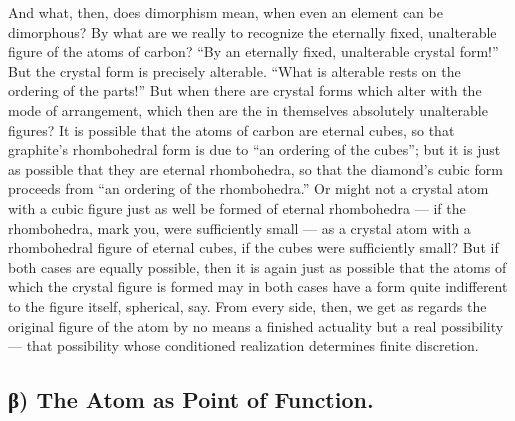 \documentclass[12pt,a4paper]{book}
\begin{document}
And what, then, does dimorphism mean, when even an element can be dimorphous?
By what are we really to recognize the eternally fixed, unalterable figure of
the atoms of carbon? ``By an eternally fixed, unalterable crystal form!''
But the crystal form is precisely alterable. ``What is alterable rests on the
ordering of the parts!'' But when there are crystal forms which alter with the
mode of arrangement, which then are the in themselves absolutely unalterable
figures? It is possible that the atoms of carbon are eternal cubes, so that
graphite's rhombohedral form is due to ``an ordering of the cubes''; but it is
just as possible that they are eternal rhombohedra, so that the diamond's cubic
form proceeds from ``an ordering of the rhombohedra.'' Or might not a crystal
atom with a cubic figure just as well be formed of eternal rhombohedra --- if
the rhombohedra, mark you, were sufficiently small --- as a crystal atom with a
rhombohedral figure of eternal cubes, if the cubes were sufficiently small? But
if both cases are equally possible, then it is again just as possible that the
atoms of which the crystal figure is formed may in both cases have a form quite
indifferent to the figure itself, spherical, say. From every side, then, we get
as regards the original figure of the atom by no means a finished actuality but
a real possibility --- that possibility whose conditioned realization
determines finite discretion.

\subsection*{β) The Atom as Point of Function.}

\end{document}
